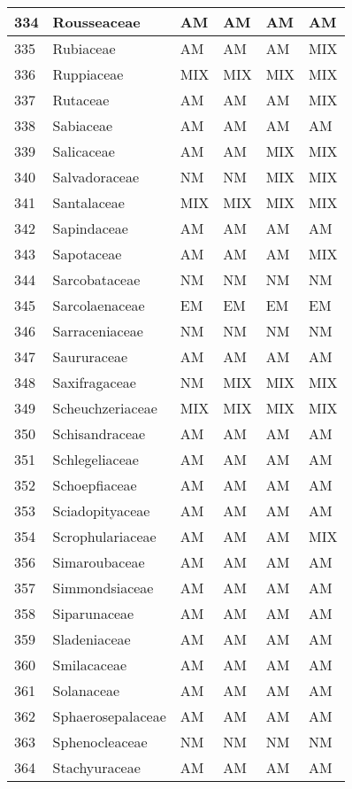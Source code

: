 \documentclass[]{article}
\begin{document}
\begin{longtable}{l|l|l|l|l|l}
\hline
334 & Rousseaceae & AM & AM & AM & AM\\
\hline
335 & Rubiaceae & AM & AM & AM & MIX\\
\hline
336 & Ruppiaceae & MIX & MIX & MIX & MIX\\
\hline
337 & Rutaceae & AM & AM & AM & MIX\\
\hline
338 & Sabiaceae & AM & AM & AM & AM\\
\hline
339 & Salicaceae & AM & AM & MIX & MIX\\
\hline
340 & Salvadoraceae & NM & NM & MIX & MIX\\
\hline
341 & Santalaceae & MIX & MIX & MIX & MIX\\
\hline
342 & Sapindaceae & AM & AM & AM & AM\\
\hline
343 & Sapotaceae & AM & AM & AM & MIX\\
\hline
344 & Sarcobataceae & NM & NM & NM & NM\\
\hline
345 & Sarcolaenaceae & EM & EM & EM & EM\\
\hline
346 & Sarraceniaceae & NM & NM & NM & NM\\
\hline
347 & Saururaceae & AM & AM & AM & AM\\
\hline
348 & Saxifragaceae & NM & MIX & MIX & MIX\\
\hline
349 & Scheuchzeriaceae & MIX & MIX & MIX & MIX\\
\hline
350 & Schisandraceae & AM & AM & AM & AM\\
\hline
351 & Schlegeliaceae & AM & AM & AM & AM\\
\hline
352 & Schoepfiaceae & AM & AM & AM & AM\\
\hline
353 & Sciadopityaceae & AM & AM & AM & AM\\
\hline
354 & Scrophulariaceae & AM & AM & AM & MIX\\
\hline
356 & Simaroubaceae & AM & AM & AM & AM\\
\hline
357 & Simmondsiaceae & AM & AM & AM & AM\\
\hline
358 & Siparunaceae & AM & AM & AM & AM\\
\hline
359 & Sladeniaceae & AM & AM & AM & AM\\
\hline
360 & Smilacaceae & AM & AM & AM & AM\\
\hline
361 & Solanaceae & AM & AM & AM & AM\\
\hline
362 & Sphaerosepalaceae & AM & AM & AM & AM\\
\hline
363 & Sphenocleaceae & NM & NM & NM & NM\\
\hline
364 & Stachyuraceae & AM & AM & AM & AM\\

\end{longtable}
\end{document}
